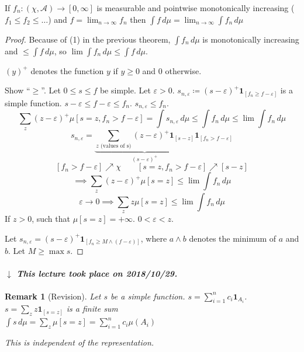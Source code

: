 \documentclass[a4paper]{article}
\numberwithin{lecref}{section}
\theoremstyle{break}
\newtheorem*{Remark}{Remark}
\newcommand{\dateref}[1]{%
  \begin{mdframed}[backgroundcolor=gray!10,innerbottommargin=0pt,innertopmargin=0pt]
    \paragraph{\textit{$\downarrow$ This lecture took place on #1.}}%
  \end{mdframed}%
}
\begin{document}
\begin{theorem}
  If $f_n: (\chi, \mathcal A) \to [0, \infty]$ is measurable and pointwise monotonically increasing ($f_1 \leq f_2 \leq \dots$) and $f = \lim_{n\to\infty} f_n$ then $\int f \, d\mu = \lim_{n\to\infty} \int f_n \, d\mu$
\end{theorem}

\begin{proof}
  Because of (1) in the previous theorem, $\int f_n \, d\mu$ is monotonically increasing and $\leq \int f \, d\mu$, so $\lim \int f_n \, d\mu \leq \int f \, d\mu$.

  $(y)^+$ denotes the function $y$ if $y \geq 0$ and $0$ otherwise.

  Show \enquote{$\geq$}. Let $0 \leq s \leq f$ be simple. Let $\varepsilon > 0$.
  $s_{n,\varepsilon} \coloneqq (s - \varepsilon)^+ \mathbf{1}_{[f_n \geq f - \varepsilon]}$ is a simple function. $s - \varepsilon \leq f - \varepsilon \leq f_n$. $s_{n,\varepsilon} \leq f_n$.
  \[ \sum_{z} (z - \varepsilon)^+ \mu\left[s = z, f_n > f - \varepsilon\right] = \int s_{n,\varepsilon} \, d\mu \leq \int f_n \, d\mu \leq \lim \int f_n \, d\mu \]
  \[ s_{n,\varepsilon} = \underbrace{\sum_{z \text{ (values of s)}} (z - \varepsilon)^+ \mathbf{1}_{\left[s - z\right]}}_{(s - \varepsilon)^+} \mathbf{1}_{[f_n > f - \varepsilon]} \]
  \[ [f_n > f - \varepsilon] \nearrow \chi \qquad [s = z, f_n > f - \varepsilon] \nearrow [s - z] \]
  \[ \implies \sum_z (z - \varepsilon)^+ \mu[s = z] \leq \lim \int f_n \, d\mu \]
  \[ \varepsilon\to0 \implies \sum_z z \mu[s = z] \leq \lim \int f_n \, d\mu \]
  If $z > 0$, such that $\mu[s = z] = +\infty$. $0 < \varepsilon < z$.

  Let $s_{n,\varepsilon} = (s - \varepsilon)^+ \mathbf{1}_{[f_n \geq M \land (f - \varepsilon)]}$, where $a \land b$ denotes the minimum of $a$ and $b$. Let $M \geq \max{s}$.
\end{proof}


\dateref{2018/10/29}

\begin{Remark}[Revision]
  Let $s$ be a simple function. $s = \sum_{i = 1}^n c_i \mathbf{1}_{A_i}$. \\
  $s = \sum_{z} z \mathbf{1}_{[s = z]}$ is a finite sum \\
  $\int s \, d\mu = \sum_z \mu[s = z] = \sum_{i=1}^n c_i \mu(A_i)$

  This is independent of the representation.
\end{Remark}
\end{document}
